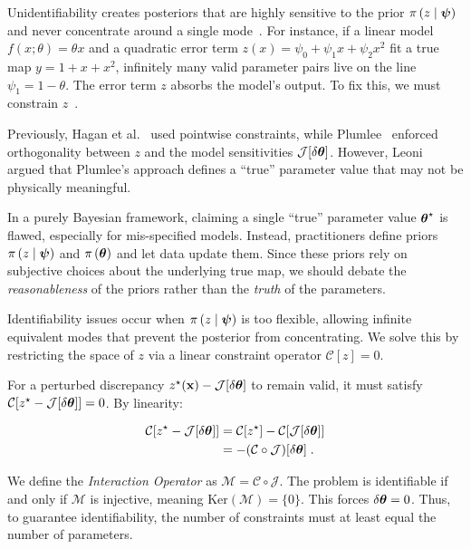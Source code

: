 \smallskip
Unidentifiability creates posteriors that are highly sensitive to the prior $\pi \left( z \mid \boldsymbol{\psi}\right)$~\cite{Tuo2015} and never concentrate around a single mode~\cite{hagan_2014}. For instance, if a linear model $f(x; \theta) = \theta x$ and a quadratic error term $z(x) = \psi_0 + \psi_1 x + \psi_2 x^2$ fit a true map $y = 1 + x + x^2$, infinitely many valid parameter pairs live on the line $\psi_1 = 1 - \theta$. The error term $z$ absorbs the model's output. To fix this, we must constrain $z$~\cite{hagan_2014,Plumlee2017,leoni}.

\smallskip
Previously, Hagan et al.~\cite{hagan_2014} used pointwise constraints, while Plumlee~\cite{Plumlee2017} enforced orthogonality between $z$ and the model sensitivities $\mathcal{J}[\delta \boldsymbol{\theta}]$. However, Leoni~\cite{leoni} argued that Plumlee's approach defines a ``true'' parameter value that may not be physically meaningful.

\smallskip
In a purely Bayesian framework, claiming a single ``true'' parameter value $\boldsymbol{\theta}^\star$ is flawed, especially for mis-specified models. Instead, practitioners define priors $\pi \left( z \mid \boldsymbol{\psi}\right)$ and $\pi \left( \boldsymbol{\theta}\right)$ and let data update them. Since these priors rely on subjective choices about the underlying true map, we should debate the \textit{reasonableness} of the priors rather than the \textit{truth} of the parameters.

\smallskip
Identifiability issues occur when $\pi \left( z \mid \boldsymbol{\psi}\right)$ is too flexible, allowing infinite equivalent modes that prevent the posterior from concentrating. We solve this by restricting the space of $z$ via a linear constraint operator $\mathcal{C}[z] = 0$.

\smallskip
For a perturbed discrepancy $z^\star(\mathbf{x}) - \mathcal{J}[\delta \boldsymbol{\theta}]$ to remain valid, it must satisfy $\mathcal{C}[z^\star - \mathcal{J}[\delta \boldsymbol{\theta}]] = 0$. By linearity:

\begin{equation}
    \begin{aligned}
        \mathcal{C}[z^\star - \mathcal{J}[\delta \boldsymbol{\theta}]] &= \mathcal{C}[z^\star] - \mathcal{C}[\mathcal{J}[\delta \boldsymbol{\theta}]] \\
        &= - (\mathcal{C} \circ \mathcal{J}) [\delta \boldsymbol{\theta}]\;. \\
    \end{aligned}
\end{equation}

We define the \textit{Interaction Operator} as $\mathcal{M} = \mathcal{C} \circ \mathcal{J}$. The problem is identifiable if and only if $\mathcal{M}$ is injective, meaning $\text{Ker}(\mathcal{M}) = \{0\}$. This forces $\delta \boldsymbol{\theta} = 0$. Thus, to guarantee identifiability, the number of constraints must at least equal the number of parameters.

